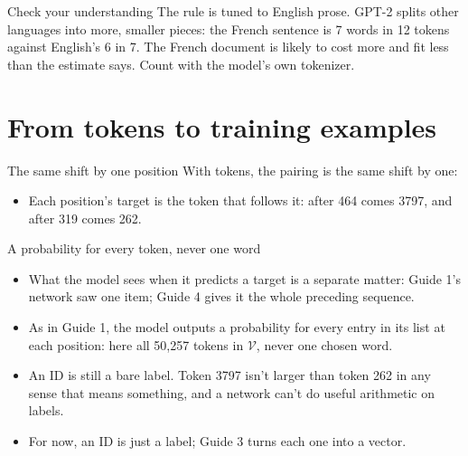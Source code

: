 \documentclass[aspectratio=169,11pt,t,\primeropts]{beamer}
\begin{document}
\begin{frame}{Check your understanding}
  {The rule is tuned to English prose. GPT-2 splits other languages into more, smaller pieces: the
    French sentence is 7 words in 12 tokens against English's 6 in 7. The French document is
    likely to cost more and fit less than the estimate says. Count with the model's own tokenizer.}
\end{frame}

\section{From tokens to training examples}

\begin{frame}{The same shift by one position}
   With
  tokens, the pairing is the same shift by one:
  \vspace{1mm}
  \pause
  \begin{itemize}
    \item Each position's target is the token that follows it: after 464 comes 3797, and after 319
      comes 262.
  \end{itemize}
\end{frame}

\begin{frame}{A probability for every token, never one word}
  \begin{itemize}
    \item What the model sees when it predicts a target is a separate matter: Guide 1's network saw
      one item; Guide 4 gives it the whole preceding sequence.
    \item As in Guide 1, the model outputs a probability for every entry in its list at each
      position: here all 50,257 tokens in $\mathcal{V}$, never one chosen word.
    \item<2-> An ID is still a bare label. Token 3797 isn't larger than token 262 in any sense
      that means something, and a network can't do useful arithmetic on labels.
    \item<3-> For now, an ID is just a label; Guide 3 turns each one into a vector.
  \end{itemize}
\end{frame}
\end{document}
